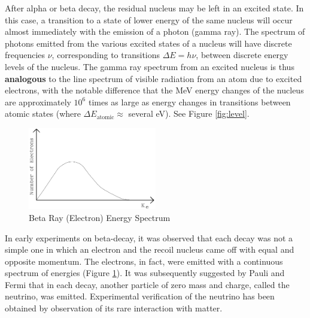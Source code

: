After alpha or beta decay, the residual nucleus may be left in an excited state. In this case, a transition to a state of lower energy of the same nucleus will occur almost immediately with the emission of a photon (gamma ray). The spectrum of photons emitted from the various excited states of a nucleus will have discrete frequencies $\nu$, corresponding to transitions $\Delta E=h\nu$, between discrete energy levels of the nucleus. The gamma ray spectrum from an excited nucleus is thus \textbf{analogous} to the line spectrum of visible radiation from an atom due to excited electrons, with the notable difference that the MeV energy changes of the nucleus are approximately $10^6$ times as large as energy changes in transitions between atomic states (where $\Delta E_{\mathrm{atomic}}\approx$ several eV). See Figure {\ref{fig:level}}.\myskip
\begin{figure}[h]
\centering
\includegraphics[width=0.5\textwidth]{./Exp10/pic/image2.png}
\caption{Beta Ray (Electron) Energy Spectrum}
\label{fig:betaray}
\end{figure} 

In early experiments on beta-decay, it was observed that each decay was not a simple one in which an electron and the recoil nucleus came off with equal and opposite momentum. The electrons, in fact, were emitted with a continuous spectrum of energies (Figure {\ref{fig:betaray}}). It was subsequently suggested by Pauli and Fermi that in each decay, another particle of zero mass and charge, called the neutrino, was emitted. Experimental verification of the neutrino has been obtained by observation of its rare interaction with matter.


